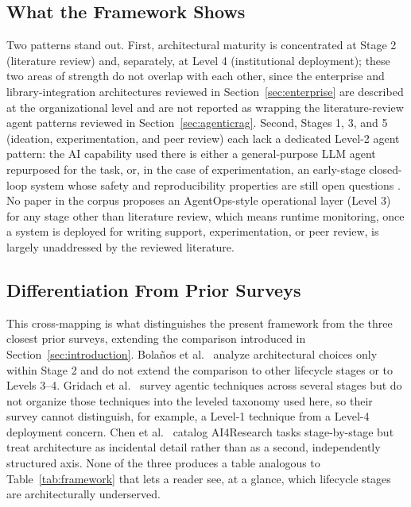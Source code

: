 \documentclass[sn-basic,Numbered]{sn-jnl}
\begin{document}
\subsection{What the Framework Shows}

Two patterns stand out. First, architectural maturity is concentrated
at Stage 2 (literature review) and, separately, at Level 4
(institutional deployment); these two areas of strength do not overlap
with each other, since the enterprise and library-integration
architectures reviewed in Section~\ref{sec:enterprise} are described
at the organizational level and are not reported as wrapping the
literature-review agent patterns reviewed in
Section~\ref{sec:agenticrag}. Second, Stages 1, 3, and 5 (ideation,
experimentation, and peer review) each lack a dedicated Level-2 agent
pattern: the AI capability used there is either a general-purpose LLM
agent repurposed for the task, or, in the case of experimentation, an
early-stage closed-loop system whose safety and reproducibility
properties are still open questions \cite{kohli2025autonomous}. No
paper in the corpus proposes an AgentOps-style operational layer
(Level 3) for any stage other than literature review, which means
runtime monitoring, once a system is deployed for writing support,
experimentation, or peer review, is largely unaddressed by the
reviewed literature.

\subsection{Differentiation From Prior Surveys}

This cross-mapping is what distinguishes the present framework from
the three closest prior surveys, extending the comparison introduced
in Section~\ref{sec:introduction}. Bola\~nos et al.\
\cite{bolanos2024ailitreview} analyze architectural choices only
within Stage 2 and do not extend the comparison to other lifecycle
stages or to Levels 3--4. Gridach et al.\ \cite{gridach2025scientific}
survey agentic techniques across several stages but do not organize
those techniques into the leveled taxonomy used here, so their survey
cannot distinguish, for example, a Level-1 technique from a Level-4
deployment concern. Chen et al.\ \cite{chen2025ai4research} catalog
AI4Research tasks stage-by-stage but treat architecture as incidental
detail rather than as a second, independently structured axis. None of
the three produces a table analogous to
Table~\ref{tab:framework} that lets a reader see, at a glance, which
lifecycle stages are architecturally underserved.
\end{document}
